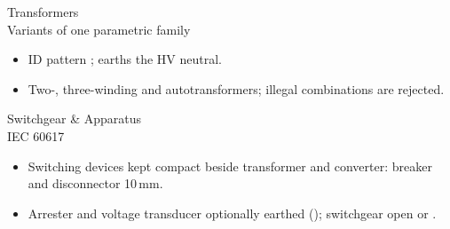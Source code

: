 \begin{frame}{Transformers\\Variants of one parametric family}
  \vspace{0.8em}

  \centering

  \vspace{0.3em}
  \raggedright
  \begin{itemize}
    \setlength{\itemsep}{0.4em}
    \item ID pattern ;  earths the HV neutral.
    \item Two-, three-winding and autotransformers; illegal combinations are rejected.
  \end{itemize}
\end{frame}


\begin{frame}{Switchgear \& Apparatus\\IEC 60617}
  \vspace{0.6em}

  \centering

  \vspace{0.3em}
  \raggedright
  \begin{itemize}
    \setlength{\itemsep}{0.4em}
    \item Switching devices kept compact beside transformer and converter: breaker and disconnector 10\,mm.
    \item Arrester and voltage transducer optionally earthed (); switchgear open or .
  \end{itemize}
\end{frame}


